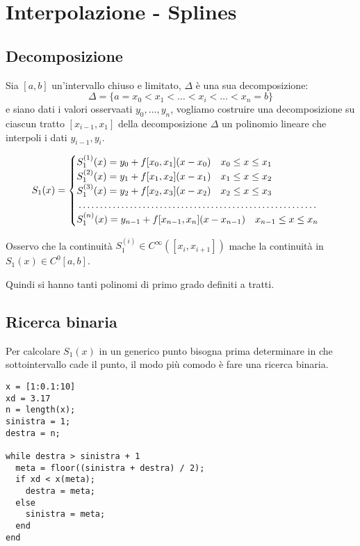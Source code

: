 \chapter{Interpolazione - Splines}
\section{Decomposizione}
Sia $[a, b]$ un'intervallo chiuso e limitato, $\Delta$ è una sua decomposizione:
\begin{equation}
  \Delta = \{a = x_0 < x_1 < \dots < x_i < \dots < x_n = b\}
\end{equation}
e siano dati i valori osservaati $y_0, \dots, y_n$, vogliamo costruire una decomposizione
su ciascun tratto $[x_{i-1}, x_1]$ della decomposizione $\Delta$ un polinomio lineare che interpoli
i dati $y_{i-1}, y_i$.

\begin{equation}
 S_1(x) = \begin{cases}
    S_1^{(1)}(x) = y_0 + f[x_0, x_1](x - x_0) \quad x_0 \leq x \leq x_1 \\
    S_1^{(2)}(x) = y_1 + f[x_1, x_2](x - x_1) \quad x_1 \leq x \leq x_2 \\
    S_1^{(3)}(x) = y_2 + f[x_2, x_3](x - x_2) \quad x_2 \leq x \leq x_3 \\
    
    \dotfill \\

    S_1^{(n)}(x) = y_{n-1} + f[x_{n-1}, x_n](x - x_{n-1}) \quad x_{n-1} \leq x \leq x_n
 \end{cases}
\end{equation}


Osservo che la continuità $S_1^{(i)} \in C^{\infty}([x_i, x_{i+1}])$ mache la continuità in 
$S_1(x) \in C^0[a, b]$.

Quindi si hanno tanti polinomi di primo grado definiti a tratti.

\section{Ricerca binaria}
Per calcolare $S_1(x)$ in un generico punto bisogna prima determinare in che sottointervallo cade il punto, il modo più comodo è fare una ricerca binaria.
\begin{verbatim}
x = [1:0.1:10]
xd = 3.17
n = length(x);
sinistra = 1;
destra = n;

while destra > sinistra + 1
  meta = floor((sinistra + destra) / 2);
  if xd < x(meta);
    destra = meta;
  else
    sinistra = meta;
  end
end
\end{verbatim}


